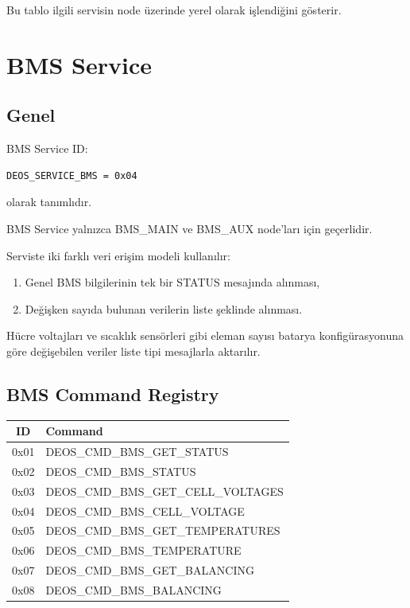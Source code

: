 \documentclass[a4paper,10pt]{article}
\begin{document}
Bu tablo ilgili servisin node üzerinde yerel olarak işlendiğini
gösterir.

\section{BMS Service}

\subsection{Genel}

BMS Service ID:

\begin{lstlisting}
DEOS_SERVICE_BMS = 0x04
\end{lstlisting}

olarak tanımlıdır.

BMS Service yalnızca BMS\_MAIN ve BMS\_AUX node'ları için geçerlidir.

Serviste iki farklı veri erişim modeli kullanılır:

\begin{enumerate}
    \item Genel BMS bilgilerinin tek bir STATUS mesajında alınması,
    \item Değişken sayıda bulunan verilerin liste şeklinde alınması.
\end{enumerate}

Hücre voltajları ve sıcaklık sensörleri gibi eleman sayısı batarya
konfigürasyonuna göre değişebilen veriler liste tipi mesajlarla
aktarılır.

\subsection{BMS Command Registry}

\begin{center}
\begin{tabular}{c l}
\toprule
\textbf{ID} & \textbf{Command} \\
\midrule

0x01 & DEOS\_CMD\_BMS\_GET\_STATUS \\
0x02 & DEOS\_CMD\_BMS\_STATUS \\

0x03 & DEOS\_CMD\_BMS\_GET\_CELL\_VOLTAGES \\
0x04 & DEOS\_CMD\_BMS\_CELL\_VOLTAGE \\

0x05 & DEOS\_CMD\_BMS\_GET\_TEMPERATURES \\
0x06 & DEOS\_CMD\_BMS\_TEMPERATURE \\

0x07 & DEOS\_CMD\_BMS\_GET\_BALANCING \\
0x08 & DEOS\_CMD\_BMS\_BALANCING \\

\bottomrule
\end{tabular}
\end{center}
\end{document}
